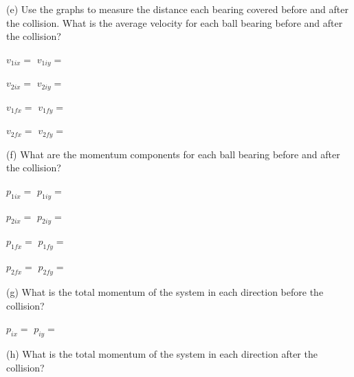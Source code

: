 
(e) Use the graphs to measure the distance each bearing covered before and after
the collision. What is the average velocity for each ball bearing before and
after the collision?
\vspace{7mm}

\( v_{1ix}= \) \hfill{}\( v_{1iy}= \)  \hfill{}
\vspace{7mm}

\( v_{2ix} =\)  \hfill{}\( v_{2iy}= \)  \hfill{}
\vspace{7mm}

\( v_{1fx} =\)  \hfill{}\( v_{1fy}= \)  \hfill{}
\vspace{7mm}

\( v_{2fx} =\)  \hfill{}\( v_{2fy}= \)  \hfill{}
\vspace{7mm}


(f) What are the momentum components for each ball bearing before and after
the collision?
\vspace{7mm}

\( p_{1ix}= \)  \hfill{}\( p_{1iy} =\)  \hfill{}
\vspace{7mm}

\( p_{2ix} =\)  \hfill{}\( p_{2iy}= \) \hfill{} 
\vspace{7mm}

\( p_{1fx} =\)  \hfill{}\( p_{1fy}= \) \hfill{} 
\vspace{7mm}

\( p_{2fx}= \) \hfill{}\( p_{2fy} =\)  \hfill{}
\vspace{7mm}

(g) What is the total momentum of the system in each direction before the 
collision?
\vspace{7mm}

\( p_{ix} =\)  \hfill{}\( p_{iy}= \) \hfill{} 
\vspace{7mm}

(h) What is the total momentum of the system in each direction after the 
collision?
\vspace{7mm}

